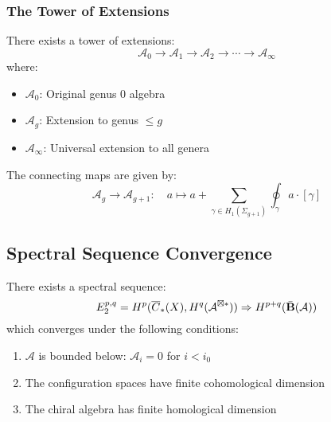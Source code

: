 \subsubsection{The Tower of Extensions}

\begin{theorem}
There exists a tower of extensions:
\[
\mathcal{A}_0 \to \mathcal{A}_1 \to \mathcal{A}_2 \to \cdots \to \mathcal{A}_\infty
\]
where:
\begin{itemize}
\item $\mathcal{A}_0$: Original genus 0 algebra
\item $\mathcal{A}_g$: Extension to genus $\leq g$
\item $\mathcal{A}_\infty$: Universal extension to all genera
\end{itemize}

The connecting maps are given by:
\[
\mathcal{A}_g \to \mathcal{A}_{g+1}: \quad a \mapsto a + \sum_{\gamma \in H_1(\Sigma_{g+1})} \oint_\gamma a \cdot [\gamma]
\]
\end{theorem}

\subsection{Spectral Sequence Convergence}

\begin{theorem}
There exists a spectral sequence:
$$E_2^{p,q} = H^p(\overline{C}_{*}(X), H^q(\mathcal{A}^{\boxtimes *})) \Rightarrow H^{p+q}(\bar{\mathbf{B}}(\mathcal{A}))$$
which converges under the following conditions:
\begin{enumerate}
\item $\mathcal{A}$ is bounded below: $\mathcal{A}_i = 0$ for $i < i_0$
\item The configuration spaces have finite cohomological dimension
\item The chiral algebra has finite homological dimension
\end{enumerate}
\end{theorem}

